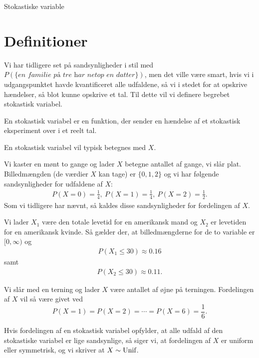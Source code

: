 
\begin{center}
\Huge
Stokastiske variable
\end{center}
\section*{Definitioner}

Vi har tidligere set på sandsynligheder i stil med $P(\{\textit{en familie på tre har netop en datter}\})$, men det ville være smart, hvis vi i udgangspunktet havde kvantificeret alle udfaldene, så vi i stedet for at opskrive hændelser, så blot kunne opskrive et tal. Til dette vil vi definere begrebet stokastisk variabel.
\begin{defn}
En stokastisk variabel er en funktion, der sender en hændelse af et stokastisk eksperiment over i et reelt tal. 
\end{defn}
En stokastisk variabel vil typisk betegnes med $X$.
\begin{exa}
Vi kaster en mønt to gange og lader $X$ betegne antallet af gange, vi slår plat. Billedmængden (de værdier $X$ kan tage) er $\{0,1,2\}$ og vi har følgende sandsynligheder for udfaldene af $X$:
\begin{align*}
P(X=0) = \frac{1}{4}, \ P(X=1) = \frac{1}{4}, \ P(X=2) = \frac{1}{2}. 
\end{align*}
Som vi tidligere har nævnt, så kaldes disse sandsynligheder for fordelingen af $X$.
\end{exa}
\begin{exa}
Vi lader $X_1$ være den totale levetid for en amerikansk mand og $X_2$ er levetiden for en amerikansk kvinde. Så gælder der, at billedmængderne for de to variable er $[0,\infty)$ og
\begin{align*}
P(X_1\leq 30) \approx 0.16
\end{align*} 
samt
\begin{align*}
P(X_2\leq 30) \approx 0.11.
\end{align*}
\end{exa}
\begin{exa}
Vi slår med en terning og lader $X$ være antallet af øjne på terningen. Fordelingen af $X$ vil så være givet ved
\[P(X=1) = P(X=2) = \cdots = P(X=6) = \frac{1}{6}.\]
\end{exa}
Hvis fordelingen af en stokastisk variabel opfylder, at alle udfald af den stokastiske variabel er lige sandsynlige, så siger vi, at fordelingen af $X$ er uniform eller symmetrisk, og vi skriver at $X \sim \textnormal{Unif}$.

